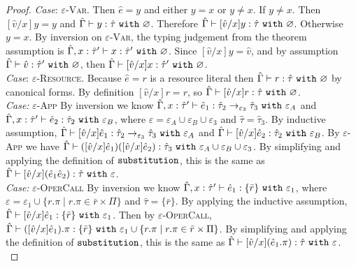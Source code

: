 \begin{appendix}
\begin{proof}
\textit{Case}: \textsc{$\varepsilon$-Var}. Then $\hat e = y$ and either $y = x$ or $y \neq x$. If $y \neq x$. Then $[\hat v/x]y = y$ and $\hat \Gamma \vdash y: \hat \tau~\mathtt{with}~ \varnothing$. Therefore $\hat \Gamma \vdash [\hat v/x]y: \hat \tau~\mathtt{with}~ \varnothing$. Otherwise $y = x$. By inversion on \textsc{$\varepsilon$-Var}, the typing judgement from the theorem assumption is $\hat \Gamma, x: \hat \tau' \vdash x: \hat \tau'~\mathtt{with}~ \varnothing$. Since $[\hat v/x]y = \hat v$, and by assumption $\hat \Gamma \vdash \hat v: \hat \tau'~\mathtt{with}~ \varnothing$, then $\hat \Gamma \vdash [\hat v/x]x: \hat \tau'~\mathtt{with}~ \varnothing$. \\

\textit{Case}: \textsc{$\varepsilon$-Resource}. Because $\hat e = r$ is a resource literal then $\hat \Gamma \vdash r: \hat \tau~\mathtt{with}~ \varnothing$ by canonical forms. By definition $[\hat v/x]r = r$, so $\hat \Gamma \vdash [\hat v/x]r: \hat \tau~\mathtt{with}~ \varnothing$. \\

\textit{Case:} \textsc{$\varepsilon$-App} By inversion we know $\hat \Gamma, x: \hat \tau' \vdash \hat e_1:\hat \tau_2 \rightarrow_{\varepsilon_3} \hat \tau_3~\mathtt{with}~ \varepsilon_A$ and $\hat \Gamma, x: \hat \tau' \vdash \hat e_2: \hat \tau_2~\mathtt{with}~ \varepsilon_B$, where $\varepsilon = \varepsilon_A \cup \varepsilon_B \cup \varepsilon_3$ and $\hat \tau = \hat \tau_3$. By inductive assumption, $\hat \Gamma \vdash [\hat v/x]\hat e_1: \hat \tau_2 \rightarrow_{\varepsilon_3} \hat \tau_3~\mathtt{with}~ \varepsilon_A$ and $\hat \Gamma \vdash [\hat v/x]\hat e_2: \hat \tau_2~\mathtt{with}~ \varepsilon_B$. By \textsc{$\varepsilon$-App} we have $\hat \Gamma \vdash ([\hat v/x]\hat e_1) ([\hat v/x]\hat e_2) : \hat \tau_3~\mathtt{with}~ \varepsilon_A \cup \varepsilon_B \cup \varepsilon_3$. By simplifying and applying the definition of $\mathtt{substitution}$, this is the same as $\hat \Gamma \vdash [\hat v/x](\hat e_1 \hat e_2): \hat \tau~\mathtt{with}~ \varepsilon$. \\

\textit{Case:} \textsc{$\varepsilon$-OperCall} By inversion we know $\hat \Gamma, x: \hat \tau' \vdash \hat e_1: \{ \bar r \}~\mathtt{with}~ \varepsilon_1$, where $\varepsilon = \varepsilon_1 \cup \{ r.\pi \mid r.\pi \in \bar r \times \Pi \}$ and $\hat \tau = \{ \bar r \}$. By applying the inductive assumption, $\hat \Gamma \vdash [\hat v/x]\hat e_1 : \{ \bar r \} ~\mathtt{with}~ \varepsilon_1$. Then by \textsc{$\varepsilon$-OperCall}, $\hat \Gamma \vdash ([\hat v/x]\hat e_1).\pi: \{ \bar r \}~\mathtt{with}~ \varepsilon_1 \cup \{ r.\pi \mid r.\pi \in \bar r \times \Pi \}$. By simplifying and applying the definition of $\mathtt{substitution}$, this is the same as $\hat \Gamma \vdash [\hat v/x](\hat e_1.\pi): \hat \tau~\mathtt{with}~ \varepsilon$.\\


\end{proof}
\end{appendix}
